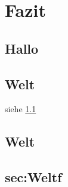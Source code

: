 \chapter{Fazit}\label{cha:Fazit}
\section{Hallo}\label{sec:Hallof}

\blindtext[20]


\section{Welt}\label{sec:Hallof2}


siehe \ref{sec:Hallof}


\blindtext[20]


\section{Welt}\section{sec:Weltf}

\blindtext[20]
